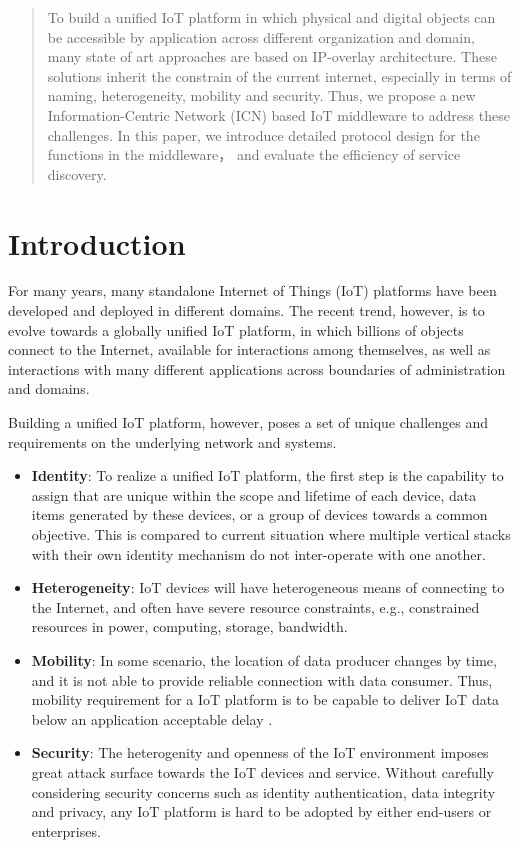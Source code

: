 \begin{abstract}
To build a unified IoT platform in which physical and digital objects can be accessible by application across different organization and domain, many state of art approaches are based on IP-overlay architecture. These solutions inherit the constrain of the current internet, especially in terms of naming, heterogeneity, mobility and security. Thus, we propose a new Information-Centric Network (ICN) based IoT middleware to address these challenges. In this paper, we introduce detailed protocol design for the functions in the middleware， and evaluate the efficiency of service discovery.
\end{abstract}

\section{Introduction}
For many years, many standalone Internet of Things (IoT) platforms have been developed and deployed in different domains. The recent trend, however, is to evolve towards a globally unified IoT platform, in which billions of objects connect to the Internet, available for interactions among themselves, as well as interactions with many different applications across boundaries of administration and domains. 


Building a unified IoT platform, however, poses a set of unique challenges and requirements on the underlying network and systems.
\begin{itemize}
\vspace{1mm}\item{\bf Identity}:
To realize a unified IoT platform, the first step is the capability to assign that are unique within the scope and lifetime of each device, data items generated by these devices, or a group of devices towards a common objective. This is compared to current situation where multiple vertical stacks with their own identity mechanism do not inter-operate with one another.
\vspace{1mm}\item{\bf Heterogeneity}:
IoT devices will have heterogeneous means of connecting to the Internet, and often have severe resource constraints, e.g., constrained resources in power, computing, storage, bandwidth.
\vspace{1mm}\item{\bf Mobility}:
In some scenario, the location of data producer changes by time, and it is not able to provide reliable connection with data consumer. Thus, mobility requirement for a IoT platform is to be capable to deliver IoT data below an application acceptable delay .
\vspace{1mm}\item{\bf Security}:
The heterogenity and openness of the IoT environment imposes great attack surface towards the IoT devices and service. Without carefully considering security concerns such as identity authentication, data integrity and privacy, any IoT platform is hard to be adopted by either end-users or enterprises.
\end{itemize}

